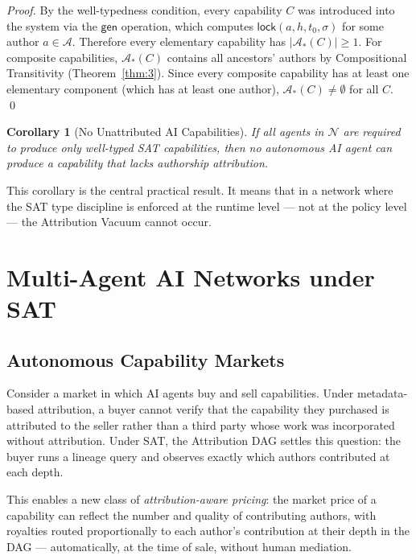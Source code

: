 \documentclass[12pt]{article}
\newtheorem{corollary}[theorem]{Corollary}
\newcommand{\ATTR}{\mathcal{A}}
\newcommand{\LOCK}{\mathsf{lock}}
\newcommand{\GEN}{\mathsf{gen}}
\begin{document}
\begin{proof}
  By the well-typedness condition, every capability $C$ was introduced into the
  system via the $\GEN$ operation, which computes $\LOCK(a, h, t_0, \sigma)$
  for some author $a \in \mathcal{A}$.  Therefore every elementary capability
  has $|\ATTR_*(C)| \ge 1$.  For composite capabilities, $\ATTR_*(C)$ contains
  all ancestors' authors by Compositional Transitivity
  (Theorem~\ref{thm:3}).  Since every composite capability has at least one
  elementary component (which has at least one author), $\ATTR_*(C) \ne \emptyset$
  for all $C$. \qed
\end{proof}

\begin{corollary}[No Unattributed AI Capabilities]
  If all agents in $\mathcal{N}$ are required to produce only well-typed SAT
  capabilities, then no autonomous AI agent can produce a capability that lacks
  authorship attribution.
\end{corollary}

This corollary is the central practical result.  It means that in a network
where the SAT type discipline is enforced at the runtime level — not at the
policy level — the Attribution Vacuum cannot occur.

\section{Multi-Agent AI Networks under SAT}
\label{sec:multiagent}

\subsection{Autonomous Capability Markets}

Consider a market in which AI agents buy and sell capabilities.  Under
metadata-based attribution, a buyer cannot verify that the capability they
purchased is attributed to the seller rather than a third party whose work was
incorporated without attribution.  Under SAT, the Attribution DAG settles this
question: the buyer runs a lineage query and observes exactly which authors
contributed at each depth.

This enables a new class of \emph{attribution-aware pricing}: the market price
of a capability can reflect the number and quality of contributing authors, with
royalties routed proportionally to each author's contribution at their depth in
the DAG — automatically, at the time of sale, without human mediation.
\end{document}
